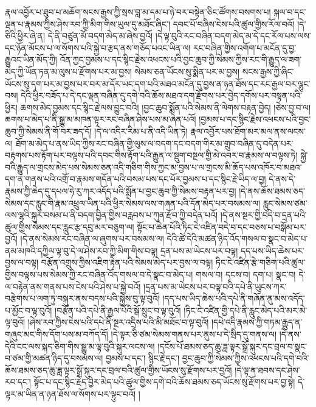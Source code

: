 རྣལ་འབྱོར་པ་ཐུབ་པ་མཆོག་སངས་རྒྱས་ཀྱི་སྲས་བླ་མ་དམ་པ་ཉེ་བར་བསྟེན་ཅིང་ཚོགས་བསགས་པ། སྐལ་བ་དང་ལྡན་པ་རྣམས་ཀྱིས་ཤེས་རབ་ཀྱི་མིག་གིས་ཡུལ་དུ་མཐོང་ཞིང་། དབང་པོ་བཞིས་ངེས་པའི་ཚུལ་གྱིས་རོལ་བའོ། །དེ་ཅིའི་ཕྱིར་ཞེ་ན། དེ་ནི་བཙུན་མོ་བདག་མེད་མ་ཞེས་བྱའོ། །དེ་ལྟ་བུའི་རང་བཞིན་བདག་མེད་མ་དེ་དང་རོལ་པས་ལས་དང་ཉོན་མོངས་པ་ལ་སོགས་པའི་སྐྱེ་བ་རྩད་ནས་གཅོད་པའང་ཡིན་ལ། རང་བཞིན་གྱིས་འགོག་པ་མངོན་དུ་བྱ་རྒྱུའང་ཡིན་མོད་ཀྱི། འོན་ཀྱང་བྱམས་པ་དང་སྙིང་རྗེས་འཕངས་པའི་བྱང་ཆུབ་ཀྱི་སེམས་ཀྱིས་རང་གི་རྒྱུད་ལ་ཟག་མེད་ཀྱི་ཡོན་ཏན་མ་ལུས་པ་རྫོགས་པར་མ་བྱས། སེམས་ཅན་ཡོངས་སུ་སྨིན་པར་མ་བྱས། སངས་རྒྱས་ཀྱི་ཞིང་ཡོངས་སུ་དག་པར་མ་བྱས་པར་བར་མ་དོར་ཡང་དག་པའི་མཐའ་མངོན་དུ་བྱས་ན་ཉན་ཐོས་དང་རང་རྒྱལ་བར་ལྷུང་བས། དེའི་ཕྱིར་བཟོད་པ་དེ་དང་ལྡན་བཞིན་དུ་དགེ་བའི་ཆོས་མཐའ་དག་རྫོགས་པར་བྱེད་དགོས་པར་བསྟན་པའི་ཕྱིར། ཆགས་མེད་བྱམས་དང་སྙིང་རྗེ་ལས་བྱུང་བའི། །བྱང་ཆུབ་སྨོན་པའི་སེམས་ནི་ལེགས་བརྟན་བྱེད། །ཅེས་བྱ་བ་ལ། ཆགས་པ་མེད་པ་ནི་སྒྱུ་མ་མཁན་ལྟར་རང་བཞིན་ཤེས་པས་མ་ཞེན་པའོ། །བྱམས་པ་དང་སྙིང་རྗེས་འཕངས་པའི་བྱང་ཆུབ་ཀྱི་སེམས་ནི་གོ་བར་ཟད་དོ། །དེ་ལ་འདིར་རིམ་པ་ནི་འདི་ཡིན་ཏེ། རྣལ་འབྱོར་པས་ཐོག་མར་མལ་ནས་ལངས་ལ། ཐོག་མ་མེད་པ་ནས་ཡིད་ཀྱིས་རང་བཞིན་གྱི་ལུས་ལ་བདག་དང་བདག་གིར་མ་གྲུབ་བཞིན་དུ་བདེན་པར་བརྟགས་པས་རྟོག་པར་བལྟས་པའི་དབང་གིས་རྟོག་པའི་རྒྱུན་ལ་སྡུག་བསྔལ་གྱི་མེ་འབར་བ་རྣམས་ལ་བལྟས་ཏེ། སྐྱེ་བའི་རྒྱུད་ལ་གྲངས་མེད་པས་སེམས་ཅན་འདི་གཅིག་གིས་ཀྱང་མ་བྱས་པ་ལ་གྲངས་མི་ཆོད་པས་འཁོར་བ་མཐའ་དག་ན་གནས་པའི་འགྲོ་བ་རྣམས་གདོན་པའི་བསམ་པས་དང་པོར་བྱམས་པ་དང་སྙིང་རྗེ་ཡིད་ལ་བྱ། དེ་ནས་དེ་རྣམས་ཀྱི་ཆེད་དུ་དཔལ་ཧེ་རུ་ཀར་འདོད་པའི་སྨོན་པ་བྱང་ཆུབ་ཀྱི་སེམས་བརྟན་པར་བྱ། །དེ་ནས་ཆོས་ཐམས་ཅད་སེམས་དང་རླུང་གི་རྣམ་འཕྲུལ་ཡིན་པའི་ཕྱིར་སེམས་ལས་གཞན་པའི་དོན་མེད་པར་བསམས་ལ། རླུང་སེམས་ཙམ་ལས་ལྷའི་སྐུར་བསམ་པ་ནི་བདག་བྱིན་གྱིས་བརླབས་པ་ཀུན་རྫོབ་ཀྱི་བདེན་པའོ། །དེ་ནས་སྔར་གྱི་བདེ་བ་དྲན་པའི་ཚུལ་གྱིས་སེམས་དང་རླུང་རྩ་དབུ་མར་བཅུག་ལ། སྟོང་པ་ཆེན་པོའི་ཏིང་ངེ་འཛིན་བདེ་བ་དང་བཅས་པ་བསྒོམ་པར་བྱའོ། །དེ་ནས་སེམས་རང་བཞིན་ལ་ཞུགས་པར་བསམས་ལ། དེའི་ཚེ་དེའི་མཚན་ཉིད་འོད་གསལ་བ་སྣང་བ་མེད་པ་ནམ་མཁའི་དཀྱིལ་ལྟ་བུ་དེ་ལ་ཤེས་རབ་ཀྱི་མིག་གིས་བལྟ། དྲན་པས་མ་ཡེངས་པར་བལྟ། དད་པས་ཡིད་ཆེས་པར་བྱས་ལ་བལྟ། བརྩོན་འགྲུས་ཀྱིས་འཇིག་རྟེན་པའི་སེམས་མེད་པར་བྱས་ལ་བལྟ། ཏིང་ངེ་འཛིན་རྩེ་གཅིག་པའི་ཚུལ་གྱིས་བལྟས་པས་སེམས་ཀྱི་རང་བཞིན་འོད་གསལ་བ་དེ་སྣང་བ་མེད་པ། གསལ་བ། དྭངས་བ། དག་པ། སྣང་བ། དེ་ལ་བརྟེན་ནས་གནས་པས་ངེས་པའི་ཤེས་པ་སྐྱེ་བའོ། །དྲན་པས་མ་ཡེངས་པར་བལྟ་བའི་དཔེ་ནི་ཡུངས་ཀར་བརྩེགས་པ་ལག་ཏུ་བསྐུར་ནས་བདས་པའི་སྐྱེས་བུ་ལྟ་བུའོ། །དད་པས་ཡིད་ཆེས་པའི་དཔེ་ནི་གཞོན་ནུ་མས་འདོད་པ་མྱོང་བ་ལྟ་བུའོ། །བརྩོན་པའི་དཔེ་ནི་རྒྱལ་པོའི་སྒོ་སྲུང་བ་ལྟ་བུའོ། །ཏིང་ངེ་འཛིན་གྱི་དཔེ་ནི་རླུང་མེད་པའི་མར་མེ་ལྟ་བུའོ། །ཤེས་རབ་ཀྱིས་ངེས་པའི་དཔེ་ནི་སྔར་འདྲིས་པའི་མི་མཐོང་བ་ལྟ་བུའོ། །དཔེ་འདི་རྣམས་ཀྱི་གཏམ་རྒྱུད་ན་གཞུང་མང་གིས་དོག་པས་མ་བཀོད་དོ། །དེ་ལྟར་ཅི་ཙམ་སེམས་གནས་པར་ནུས་པ་དེ་སྲིད་དུ་གནས་ལ། །དེ་ནས་དེའི་ངང་ལས་སྐད་ཅིག་གིས་སྒྱུ་མ་ལྟ་བུའི་སྐུར་ལངས་ལ། །དངོས་པོ་ཐམས་ཅད་ཆུ་ཟླ་ལྟར་སྒྲོ་སྐུར་དང་བྲལ་བ་སྣང་བ་ཙམ་གྱི་མཚན་ཉིད་དུ་བསམས་ལ། བྱམས་པ་དང་། སྙིང་རྗེ་དང་། བྱང་ཆུབ་ཀྱི་སེམས་ཀྱིས་འཕངས་པའི་དགེ་བའི་ཆོས་ཐམས་ཅད་ཆུ་ཟླ་ལྟར་སྒྲོ་སྐུར་དང་བྲལ་བའི་ཚུལ་གྱིས་ཡོངས་སུ་རྫོགས་པར་བྱའོ། །དེ་ལྟ་ན་ཐབས་དང་ཤེས་རབ་དང་། སྟོང་པ་དང་སྙིང་རྗེད་བྱེར་མེད་པའི་ཚུལ་གྱིས་དགེ་བའི་ཆོས་ཐམས་ཅད་ཡོངས་སུ་རྫོགས་པར་བྱ་སྟེ། དེ་ལྟར་མ་ཡིན་ན་ཉན་ཐོས་ལ་སོགས་པར་ལྟུང་བའོ། །
